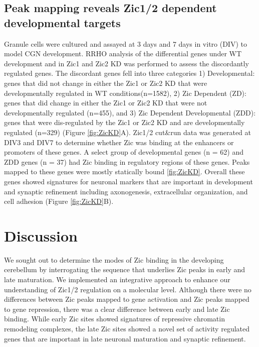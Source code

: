\documentclass[fleqn,10pt,twocolumn]{wlscirep}
\begin{document}
\subsection*{Peak mapping reveals Zic1/2 dependent developmental targets}
Granule cells were cultured and assayed at 3 days and 7 days in vitro (DIV) to model CGN development. RRHO analysis of the differential genes under WT development and in Zic1 and Zic2 KD was performed to assess the discordantly regulated genes. The discordant genes fell into three categories 1) Developmental: genes that did not change in either the Zic1 or Zic2 KD that were developmentally regulated in WT conditions(n=1582), 2) Zic Dependent (ZD): genes that did change in either the Zic1 or Zic2 KD that were not developmentally regulated (n=455), and 3) Zic Dependent Developmental (ZDD): genes that were dis-regulated by the Zic1 or Zic2 KD and are developmentally regulated (n=329) (Figure \ref{fig:ZicKD}A). Zic1/2 cut&run data was generated at DIV3 and DIV7 to determine whether Zic was binding at the enhancers or promoters of these genes. A select group of developmental genes (n = 62) and ZDD genes (n = 37) had Zic binding in regulatory regions of these genes. Peaks mapped to these genes were mostly statically bound \ref{fig:ZicKD}. Overall these genes showed signatures for neuronal markers that are important in development and synaptic refinement including axonogenesis, extracellular organization, and cell adhesion (Figure \ref{fig:ZicKD}B). 

\section*{Discussion}
We sought out to determine the modes of Zic binding in the developing cerebellum by interrogating the sequence that underlies Zic peaks in early and late maturation. We implemented an integrative approach to enhance our understanding of Zic1/2 regulation on a molecular level. Although there were no differences between Zic peaks mapped to gene activation and Zic peaks mapped to gene repression, there was a clear difference between early and late Zic binding. While early Zic sites showed signatures of repressive chromatin remodeling complexes, the late Zic sites showed a novel set of activity regulated genes that are important in late neuronal maturation and synaptic refinement. 
\end{document}

